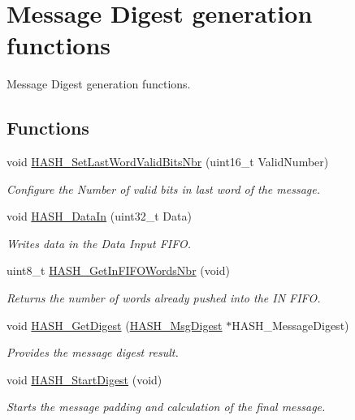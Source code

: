 \hypertarget{group___h_a_s_h___group2}{\section{Message Digest generation functions}
\label{group___h_a_s_h___group2}
}


Message Digest generation functions.  


\subsection*{Functions}
\begin{DoxyCompactItemize}
\item 
void \hyperlink{group___h_a_s_h___group2_gac4d1fa51c9240ad0287b371564b5d2a6}{H\-A\-S\-H\-\_\-\-Set\-Last\-Word\-Valid\-Bits\-Nbr} (uint16\-\_\-t Valid\-Number)
\begin{DoxyCompactList}\small\item\em Configure the Number of valid bits in last word of the message. \end{DoxyCompactList}\item 
void \hyperlink{group___h_a_s_h___group2_ga9c4c0cebdeb1ce2631dd2eeab82107ef}{H\-A\-S\-H\-\_\-\-Data\-In} (uint32\-\_\-t Data)
\begin{DoxyCompactList}\small\item\em Writes data in the Data Input F\-I\-F\-O. \end{DoxyCompactList}\item 
uint8\-\_\-t \hyperlink{group___h_a_s_h___group2_ga37bec5e637a57124f3179185d03537ab}{H\-A\-S\-H\-\_\-\-Get\-In\-F\-I\-F\-O\-Words\-Nbr} (void)
\begin{DoxyCompactList}\small\item\em Returns the number of words already pushed into the I\-N F\-I\-F\-O. \end{DoxyCompactList}\item 
void \hyperlink{group___h_a_s_h___group2_ga23018d770837d6ab9f46941f105cc017}{H\-A\-S\-H\-\_\-\-Get\-Digest} (\hyperlink{struct_h_a_s_h___msg_digest}{H\-A\-S\-H\-\_\-\-Msg\-Digest} $\ast$H\-A\-S\-H\-\_\-\-Message\-Digest)
\begin{DoxyCompactList}\small\item\em Provides the message digest result. \end{DoxyCompactList}\item 
void \hyperlink{group___h_a_s_h___group2_ga84ac2b64179fd37b75c4d5f665126e93}{H\-A\-S\-H\-\_\-\-Start\-Digest} (void)
\begin{DoxyCompactList}\small\item\em Starts the message padding and calculation of the final message. \end{DoxyCompactList}\end{DoxyCompactItemize}


